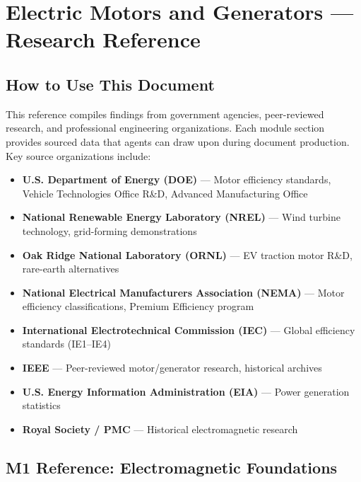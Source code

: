 \documentclass[11pt,letterpaper]{article}
\newcommand{\stageheader}[2]{%
  \noindent\colorbox{#2}{\makebox[\textwidth][l]{%
    \textcolor{white}{\bfseries\sffamily\hspace{6pt}#1\hspace{6pt}}}}%
  \vspace{0.5em}\par%
}
\begin{document}
\newpage

\stageheader{STAGE 2 --- RESEARCH REFERENCE}{secondary}

\section{Electric Motors and Generators --- Research Reference}

\subsection{How to Use This Document}

This reference compiles findings from government agencies, peer-reviewed research, and professional engineering organizations. Each module section provides sourced data that agents can draw upon during document production. Key source organizations include:

\begin{itemize}[leftmargin=2em]
\item \textbf{U.S. Department of Energy (DOE)} --- Motor efficiency standards, Vehicle Technologies Office R\&D, Advanced Manufacturing Office
\item \textbf{National Renewable Energy Laboratory (NREL)} --- Wind turbine technology, grid-forming demonstrations
\item \textbf{Oak Ridge National Laboratory (ORNL)} --- EV traction motor R\&D, rare-earth alternatives
\item \textbf{National Electrical Manufacturers Association (NEMA)} --- Motor efficiency classifications, Premium Efficiency program
\item \textbf{International Electrotechnical Commission (IEC)} --- Global efficiency standards (IE1--IE4)
\item \textbf{IEEE} --- Peer-reviewed motor/generator research, historical archives
\item \textbf{U.S. Energy Information Administration (EIA)} --- Power generation statistics
\item \textbf{Royal Society / PMC} --- Historical electromagnetic research
\end{itemize}

\subsection{M1 Reference: Electromagnetic Foundations}
\end{document}
